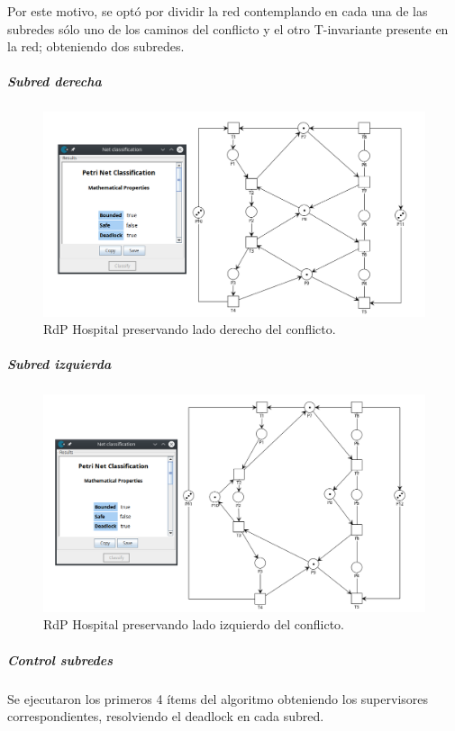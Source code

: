 Por este motivo, se optó por dividir la red contemplando en cada una de las subredes sólo uno de los caminos del conflicto y el otro T-invariante presente en la red; obteniendo dos subredes.

\subparagraph{Subred derecha}
\hfill
\begin{figure}[H]
	\centering
	\includegraphics[scale=0.5]{Figures/algoritmo3/Hospital3.png}
	\caption{RdP Hospital preservando lado derecho del conflicto.}
	\label{fig:ladoderechoconflicto}
 \end{figure}

\subparagraph{Subred izquierda}
\hfill
\begin{figure}[H]
	\centering
		\includegraphics[scale=0.5]{Figures/algoritmo3/Hospital4.png}
	\caption{RdP Hospital preservando lado izquierdo del conflicto.}
	\label{fig:ladoizquierdoconflicto}
 \end{figure}

\newpage
\subparagraph{Control subredes}
\hfill \break
Se ejecutaron los primeros 4 ítems del algoritmo obteniendo los supervisores correspondientes, resolviendo el deadlock en cada subred.
\bigskip

